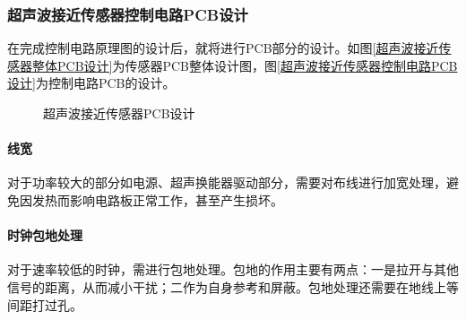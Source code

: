        \subsubsection{超声波接近传感器控制电路PCB设计}
       在完成控制电路原理图的设计后，就将进行PCB部分的设计。如图\ref{超声波接近传感器整体PCB设计}为传感器PCB整体设计图，图\ref{超声波接近传感器控制电路PCB设计}为控制电路PCB的设计。
\begin{figure}[ht]
	\centering
	\caption{超声波接近传感器PCB设计}
	\label{超声波接近传感器PCB设计}
\end{figure}
   \paragraph{线宽}
   对于功率较大的部分如电源、超声换能器驱动部分，需要对布线进行加宽处理，避免因发热而影响电路板正常工作，甚至产生损坏。\par
   \paragraph{时钟包地处理}
   对于速率较低的时钟，需进行包地处理。包地的作用主要有两点：一是拉开与其他信号的距离，从而减小干扰；二作为自身参考和屏蔽。包地处理还需要在地线上等间距打过孔。
  
